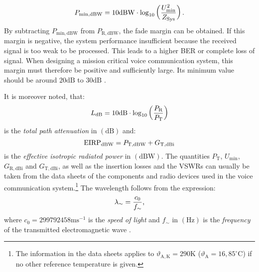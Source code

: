 \begin{equation} \label{eq:min_reception}
	\centering
	P_\mathrm{min,dBW} = 10\mathrm{dBW} \cdot \log_{10} \left( \dfrac{U_\mathrm{min}^2}{Z_\mathrm{Sys}} \right)\text{.}
\end{equation}
By subtracting $P_\mathrm{min,dBW}$ from $P_\mathrm{R,dBW}$, the fade margin can be obtained. If this margin is negative, the system performance insufficient because the received signal is too weak to be processed. This leads to a higher BER or complete loss of signal. When designing a mission critical voice communication system, this margin must therefore be positive and sufficiently large. Its minimum value should be around $20\mathrm{dB}$ to $30\mathrm{dB}$ \cite{Parsons:2000, Glover:2010, LinkMargin:2016, Tietze:2016, Mecklenbrauker:2017, Goiser:2019, Elert:2020}. 

It is moreover noted, that:
\begin{equation} \label{eq:path_attenuation}
	\centering
	L_\mathrm{dB} = 10\mathrm{dB} \cdot \log_{10} \left(\dfrac{P_\mathrm{R}}{P_\mathrm{T}}\right)
\end{equation}
is the \emph{total path attenuation} in $\left(\mathrm{dB}\right)$ and:
\begin{equation} \label{eq:path_attenuation}
	\centering
	\mathrm{EIRP}_\mathrm{dBW} = P_\mathrm{T,dBW} + G_\mathrm{T,dBi}
\end{equation}
is the \emph{effective isotropic radiated power} in $\left(\mathrm{dBW}\right)$. The quantities $P_\mathrm{T}$, $U_\mathrm{min}$, $G_\mathrm{R,dBi}$ and $G_\mathrm{T,dBi}$, as well as the insertion losses and the VSWRs can usually be taken from the data sheets of the components and radio devices used in the voice communication system.\footnote{The information in the data sheets applies to $\vartheta_\mathrm{A,K} = 290\mathrm{K}$ ($\vartheta_\mathrm{A} = 16,85^\circ \mathrm{C}$) if no other reference temperature is given.} The wavelength follows from the expression:
\begin{equation} \label{eq:lambda}
	\centering
	\lambda_\sim = \dfrac{c_0}{f_\sim}\text{,}
\end{equation}
where $c_0 = 299792458\mathrm{ms^{-1}}$ is the \emph{speed of light} and $f_\sim$ in $\left(\mathrm{Hz}\right)$ is the \emph{frequency} of the transmitted electromagnetic wave \cite{Parsons:2000, Glover:2010, Tietze:2016, Mecklenbrauker:2017, Goiser:2019, Elert:2020}. 